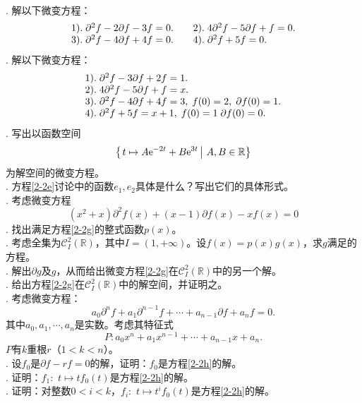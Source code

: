\documentclass[12pt,UTF8,fontset=none]{ctexbook}
\begin{document}
\begin{xt}
    \mbox{} \\
    . 解以下微变方程：\\
    $$
    \begin{array}[]{ll}
        1).\;\partial^2 f - 2 \partial f - 3 f = 0. &\quad2).\; 4\partial^2 f - 5 \partial f + f = 0. \\
        3).\;\partial^2 f - 4 \partial f + 4 f = 0. &\quad4).\; \partial^2 f + 5 f = 0. 
    \end{array}
    $$
    . 解以下微变方程：\\
    $$
    \begin{array}[]{l}
        1).\;\partial^2 f - 3 \partial f + 2 f = 1. \\
        2).\; 4\partial^2 f - 5 \partial f + f = x. \\
        3).\;\partial^2 f - 4 \partial f + 4 f = 3, \; f(0) = 2,\; \partial f(0) = 1.\\
        4).\; \partial^2 f + 5 f = x + 1,\; f(0)=1\; \partial f(0) = 0. 
    \end{array}
    $$
    . 写出以函数空间
    $$ \left\{\left.t \mapsto A\mathrm{e}^{-2t} + B\mathrm{e}^{3t}\,\right|\, A, B \in \mathbb{R}\right\} $$
    为解空间的微变方程。\\
    . 方程\eqref{2-2e}讨论中的函数$e_1, e_2$具体是什么？写出它们的具体形式。\\
    . 考虑微变方程
    \begin{equation}
        (x^2 + x) \partial^2 f(x) + (x - 1) \partial f(x) - x f(x) = 0 \label{2-2g} \tag{a}
    \end{equation}
    . 找出满足方程\eqref{2-2g}的整式函数$p(x)$。\\
    . 考虑全集为$\mathcal{C}^2_{I}(\mathbb{R})$，其中$I = (1, +\infty)$。设$f(x) = p(x)g(x)$，求$g$满足的方程。\\
    . 解出$\partial g$及$g$，从而给出微变方程\eqref{2-2g}在$\mathcal{C}^2_{I}(\mathbb{R})$中的另一个解。\\
    . 给出方程\eqref{2-2g}在$\mathcal{C}^2_{I}(\mathbb{R})$中的解空间，并证明之。\\
    . 考虑微变方程：
    \begin{equation}
        a_0\partial^n f + a_1 \partial^{n-1} f + \cdots + a_{n-1}\partial f + a_n f = 0. \label{2-2h} \tag{b}
    \end{equation}
    其中$a_0, a_1, \cdots , a_n$是实数。考虑其特征式
    $$P: a_0x^n + a_1 x^{n-1} + \cdots + a_{n-1}x + a_n . $$
    $P$有$k$重根$r$（$1<k<n$）。\\
    . 设$f_0$是$\partial f - rf = 0$的解，证明：$f_0$是方程\eqref{2-2h}的解。\\
    . 证明：$f_1:\,\,t\mapsto tf_0(t)$是方程\eqref{2-2h}的解。\\
    . 证明：对整数$0<i<k$，$f_i:\,\,t\mapsto t^if_0(t)$是方程\eqref{2-2h}的解。
\end{xt}
\end{document}
